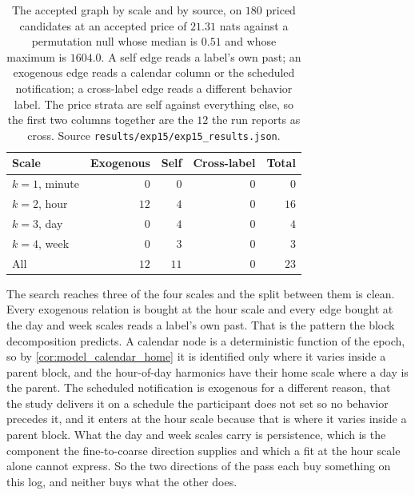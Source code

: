 \begin{table}[t]
\centering
\caption{The accepted graph by scale and by source, on $180$ priced
candidates at an accepted price of $21.31$ nats against a permutation null
whose median is $0.51$ and whose maximum is $1604.0$. A self edge reads a
label's own past; an exogenous edge reads a calendar column or the scheduled
notification; a cross-label edge reads a different behavior label. The price
strata are self against everything else, so the first two columns together are
the $12$ the run reports as cross. Source
\texttt{results/exp15/exp15\_results.json}.}
\label{tab:results:arm1_scales}
\small
\begin{tabular}{lrrrr}
\toprule
Scale & Exogenous & Self & Cross-label & Total \\
\midrule
$k=1$, minute & $0$ & $0$ & $0$ & $0$ \\
$k=2$, hour   & $12$ & $4$ & $0$ & $16$ \\
$k=3$, day    & $0$ & $4$ & $0$ & $4$ \\
$k=4$, week   & $0$ & $3$ & $0$ & $3$ \\
\midrule
All           & $12$ & $11$ & $0$ & $23$ \\
\bottomrule
\end{tabular}
\end{table}

The search reaches three of the four scales and the split between them is
clean. Every exogenous relation is bought at the hour scale and every edge
bought at the day and week scales reads a label's own past. That is the pattern
the block decomposition predicts. A calendar node is a deterministic function of
the epoch, so by \cref{cor:model_calendar_home} it is identified only where it
varies inside a parent block, and the hour-of-day harmonics have their home
scale where a day is the parent. The scheduled notification is exogenous for a
different reason, that the study delivers it on a schedule the participant does
not set so no behavior precedes it, and it enters at the hour scale because that
is where it varies inside a parent block. What the day and week scales carry
is persistence, which is the component the fine-to-coarse direction supplies and
which a fit at the hour scale alone cannot express. So the two directions of the
pass each buy something on this log, and neither buys what the other does.

